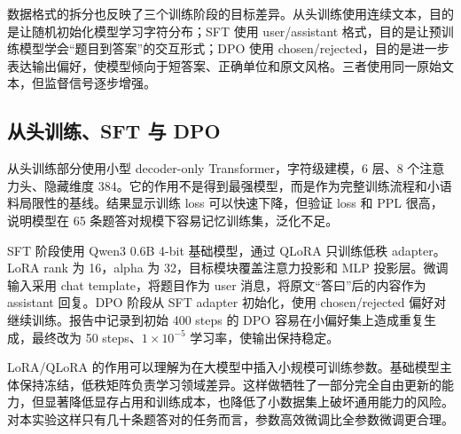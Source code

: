 \documentclass[a4paper,11pt,twocolumn]{article}
\begin{document}
数据格式的拆分也反映了三个训练阶段的目标差异。从头训练使用连续文本，目的是让随机初始化模型学习字符分布；SFT 使用 user/assistant 格式，目的是让预训练模型学会“题目到答案”的交互形式；DPO 使用 chosen/rejected，目的是进一步表达输出偏好，使模型倾向于短答案、正确单位和原文风格。三者使用同一原始文本，但监督信号逐步增强。

\begin{table}[H]
\centering
\scriptsize
\caption{《孙子算经》数据格式}
\end{table}

\subsection{从头训练、SFT 与 DPO}

从头训练部分使用小型 decoder-only Transformer，字符级建模，6 层、8 个注意力头、隐藏维度 384。它的作用不是得到最强模型，而是作为完整训练流程和小语料局限性的基线。结果显示训练 loss 可以快速下降，但验证 loss 和 PPL 很高，说明模型在 65 条题答对规模下容易记忆训练集，泛化不足。

SFT 阶段使用 Qwen3 0.6B 4-bit 基础模型，通过 QLoRA 只训练低秩 adapter。LoRA rank 为 16，alpha 为 32，目标模块覆盖注意力投影和 MLP 投影层。微调输入采用 chat template，将题目作为 user 消息，将原文“答曰”后的内容作为 assistant 回复。DPO 阶段从 SFT adapter 初始化，使用 chosen/rejected 偏好对继续训练。报告中记录到初始 400 steps 的 DPO 容易在小偏好集上造成重复生成，最终改为 50 steps、$1\times10^{-5}$ 学习率，使输出保持稳定。

LoRA/QLoRA 的作用可以理解为在大模型中插入小规模可训练参数。基础模型主体保持冻结，低秩矩阵负责学习领域差异。这样做牺牲了一部分完全自由更新的能力，但显著降低显存占用和训练成本，也降低了小数据集上破坏通用能力的风险。对本实验这样只有几十条题答对的任务而言，参数高效微调比全参数微调更合理。

\begin{table}[H]
\centering
\small
\caption{《孙子算经》大模型实验结果}
\end{table}
\end{document}
